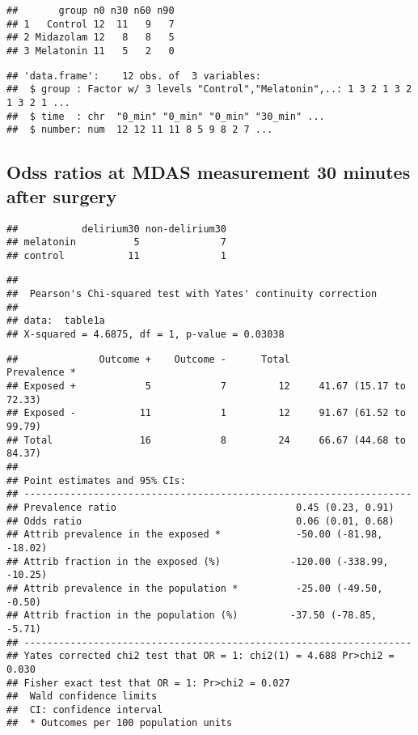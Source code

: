 \documentclass[
]{article}
\begin{document}
\begin{verbatim}
##       group n0 n30 n60 n90
## 1   Control 12  11   9   7
## 2 Midazolam 12   8   8   5
## 3 Melatonin 11   5   2   0
\end{verbatim}

\begin{verbatim}
## 'data.frame':    12 obs. of  3 variables:
##  $ group : Factor w/ 3 levels "Control","Melatonin",..: 1 3 2 1 3 2 1 3 2 1 ...
##  $ time  : chr  "0_min" "0_min" "0_min" "30_min" ...
##  $ number: num  12 12 11 11 8 5 9 8 2 7 ...
\end{verbatim}

\hypertarget{odss-ratios-at-mdas-measurement-30-minutes-after-surgery}{%
\subsection{Odss ratios at MDAS measurement 30 minutes after
surgery}\label{odss-ratios-at-mdas-measurement-30-minutes-after-surgery}}

\begin{verbatim}
##           delirium30 non-delirium30
## melatonin          5              7
## control           11              1
\end{verbatim}

\begin{verbatim}
## 
##  Pearson's Chi-squared test with Yates' continuity correction
## 
## data:  table1a
## X-squared = 4.6875, df = 1, p-value = 0.03038
\end{verbatim}

\begin{verbatim}
##              Outcome +    Outcome -      Total               Prevalence *
## Exposed +            5            7         12     41.67 (15.17 to 72.33)
## Exposed -           11            1         12     91.67 (61.52 to 99.79)
## Total               16            8         24     66.67 (44.68 to 84.37)
## 
## Point estimates and 95% CIs:
## -------------------------------------------------------------------
## Prevalence ratio                               0.45 (0.23, 0.91)
## Odds ratio                                     0.06 (0.01, 0.68)
## Attrib prevalence in the exposed *             -50.00 (-81.98, -18.02)
## Attrib fraction in the exposed (%)            -120.00 (-338.99, -10.25)
## Attrib prevalence in the population *          -25.00 (-49.50, -0.50)
## Attrib fraction in the population (%)         -37.50 (-78.85, -5.71)
## -------------------------------------------------------------------
## Yates corrected chi2 test that OR = 1: chi2(1) = 4.688 Pr>chi2 = 0.030
## Fisher exact test that OR = 1: Pr>chi2 = 0.027
##  Wald confidence limits
##  CI: confidence interval
##  * Outcomes per 100 population units
\end{verbatim}
\end{document}
